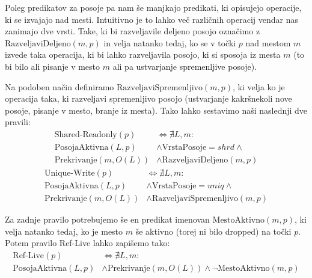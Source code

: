 \documentclass[a4paper,12pt,openright]{book}
\begin{document}
Poleg predikatov za posoje pa nam še manjkajo predikati, ki opisujejo operacije, ki se izvajajo nad mesti.
Intuitivno je to lahko več različnih operacij vendar nas zanimajo dve vrsti. Take, ki bi razveljavile deljeno
posojo označimo z $\text{RazveljaviDeljeno}(m,p)$ in velja natanko tedaj, ko se v točki $p$ nad mestom $m$ izvede
taka operacija, ki bi lahko razveljavila posojo, ki si sposoja iz mesta $m$ (to bi bilo ali pisanje v mesto $m$ ali
pa ustvarjanje spremenljive posoje).

Na podoben način definiramo $\text{RazveljaviSpremenljivo}(m,p)$, ki velja ko je operacija taka, ki razveljavi
spremenljivo posojo (ustvarjanje kakršnekoli nove posoje, pisanje v mesto, branje iz mesta).
Tako lahko sestavimo naši naslednji dve pravili:
\begin{equation}
	\begin{aligned}
		\text{Shared-Readonly}(p)   & \iff  \nexists L,m:
		\\ \text{PosojaAktivna}(L,p) &\land \text{VrstaPosoje} = shrd \land \\
		\text{Prekrivanje}(m, O(L)) & \land \text{RazveljaviDeljeno}(m,p)
	\end{aligned}
\end{equation}
\begin{equation}
	\begin{aligned}
		\text{Unique-Write}(p)      & \iff  \nexists L,m:
		\\ \text{PosojaAktivna}(L,p) &\land \text{VrstaPosoje} = uniq \land \\
		\text{Prekrivanje}(m, O(L)) & \land \text{RazveljaviSpremenljivo}(m,p)
	\end{aligned}
\end{equation}

Za zadnje pravilo potrebujemo še en predikat imenovan $\text{MestoAktivno}(m,p)$, ki velja natanko tedaj,
ko je mesto $m$ še aktivno (torej ni bilo dropped) na točki $p$. Potem pravilo Ref-Live lahko zapišemo tako:
\begin{equation}
	\begin{aligned}
		\text{Ref-Live}(p) & \iff \nexists L, m: \\ \text{PosojaAktivna}(L,p) &\land \text{Prekrivanje}(m, O(L)) \land
		\neg \text{MestoAktivno}(m,p)
	\end{aligned}
\end{equation}

\end{document}
